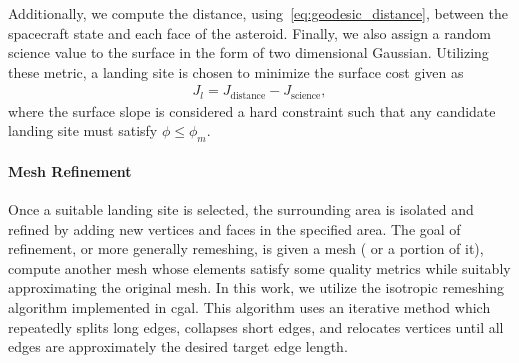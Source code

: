 Additionally, we compute the distance, using~\cref{eq:geodesic_distance}, between the spacecraft state and each face of the asteroid. 
Finally, we also assign a random science value to the surface in the form of two dimensional Gaussian.
Utilizing these metric, a landing site is chosen to minimize the surface cost given as
\begin{align}\label{eq:surface_cost}
    J_l =  J_{\text{distance}} - J_{\text{science}},
\end{align}
where the surface slope is considered a hard constraint such that any candidate landing site must satisfy \( \phi \leq \phi_m \).

\paragraph{Mesh Refinement}\label{sec:refinement}

Once a suitable landing site is selected, the surrounding area is isolated and refined by adding new vertices and faces in the specified area.
The goal of refinement, or more generally remeshing, is given a mesh ( or a portion of it), compute another mesh whose elements satisfy some quality metrics while suitably approximating the original mesh.
In this work, we utilize the isotropic remeshing algorithm implemented in \gls{cgal}.
This algorithm uses an iterative method which repeatedly splits long edges, collapses short edges, and relocates vertices until all edges are approximately the desired target edge length.

